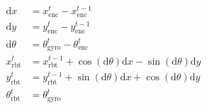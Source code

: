 \begin{center}
	\begin{align*}
		\mathrm{d}x&=x^{t}_{\mathrm{enc}}-x^{t-1}_{\mathrm{enc}} \\
		\mathrm{d}y&=y^{t}_{\mathrm{enc}}-y^{t-1}_{\mathrm{enc}} \\
		\mathrm{d}\theta&=\theta^t_{\mathrm{gyro}}-\theta^{t}_{\mathrm{enc}} \\
		x^t_{\mathrm{rbt}}&=x^{t-1}_{\mathrm{rbt}}+\cos(\mathrm{d}\theta)\mathrm{d}x-\sin(\mathrm{d}\theta)\mathrm{d}y \\
		y^t_{\mathrm{rbt}}&=y^{t-1}_{\mathrm{rbt}}+\sin(\mathrm{d}\theta)\mathrm{d}x+\cos(\mathrm{d}\theta)\mathrm{d}y \\
		\theta^t_{\mathrm{rbt}}&=\theta^t_{\mathrm{gyro}}
	\end{align*}
\end{center}
